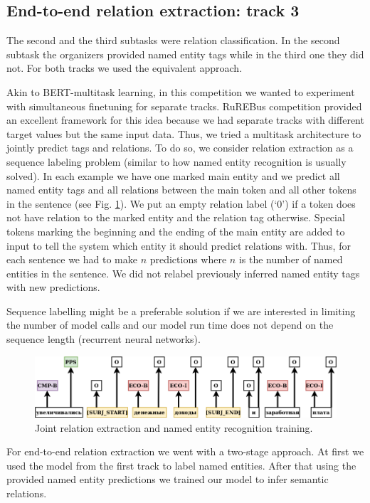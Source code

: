 \documentclass{dialogue}
\begin{document}
	\subsection{End-to-end relation extraction: track 3}
	The second and the third subtasks were relation classification. In the second subtask the organizers provided named entity tags while in the third one they did not. For both tracks we used the equivalent approach.
	
	Akin to BERT-multitask learning, in this competition we wanted to experiment with simultaneous finetuning for separate tracks. RuREBus competition provided an excellent framework for this idea because we had separate tracks with different target values but the same input data. Thus, we tried a multitask architecture to jointly predict tags and relations. To do so, we consider relation extraction as a sequence labeling problem (similar to how named entity recognition is usually solved). In each example we have one marked main entity and we predict all named entity tags and all relations between the main token and all other tokens in the sentence (see Fig. \ref{fig:rel}). We put an empty relation label (‘0’) if a token does not have relation to the marked entity and the relation tag otherwise. Special tokens marking the beginning and the ending of the main entity are added to input to tell the system which entity it should predict relations with. Thus, for each sentence we had to make $n$ predictions where $n$ is the number of named entities in the sentence. We did not relabel previously inferred named entity tags with new predictions.
	
	Sequence labelling might be a preferable solution if we are interested in limiting the number of model calls and our model run time does not depend on the sequence length (recurrent neural networks).
	
	\begin{figure}[thb]
		\centering
		\includegraphics[scale=0.5]{pics/rel2}
		\caption{Joint relation extraction and named entity recognition training.}
		\label{fig:rel}
	\end{figure}
	
	
	For end-to-end relation extraction we went with a two-stage approach. At first we used the model from the first track to label named entities. After that using the provided named entity predictions we trained our model to infer semantic relations.
	
\end{document}
